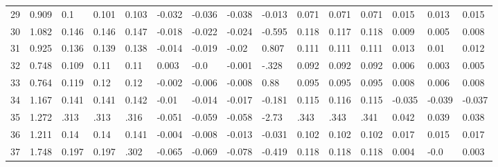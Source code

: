 \begin{table}
\begin{tabular}{|l|l|lll|lll|l|lll|lll}
		29 & 0.909 & 0.1 & 0.101 & 0.103 & -0.032 & -0.036 & -0.038 & -0.013 & 0.071 & 0.071 & 0.071 & 0.015 & 0.013 & 0.015 \\
		30 & 1.082 & 0.146 & 0.146 & 0.147 & -0.018 & -0.022 & -0.024 & -0.595 & 0.118 & 0.117 & 0.118 & 0.009 & 0.005 & 0.008 \\
		31 & 0.925 & 0.136 & 0.139 & 0.138 & -0.014 & -0.019 & -0.02 & 0.807 & 0.111 & 0.111 & 0.111 & 0.013 & 0.01 & 0.012 \\
		32 & 0.748 & 0.109 & 0.11 & 0.11 & 0.003 & -0.0 & -0.001 & -.328 & 0.092 & 0.092 & 0.092 & 0.006 & 0.003 & 0.005 \\
		33 & 0.764 & 0.119 & 0.12 & 0.12 & -0.002 & -0.006 & -0.008 & 0.88 & 0.095 & 0.095 & 0.095 & 0.008 & 0.006 & 0.008 \\
		34 & 1.167 & 0.141 & 0.141 & 0.142 & -0.01 & -0.014 & -0.017 & -0.181 & 0.115 & 0.116 & 0.115 & -0.035 & -0.039 & -0.037 \\
		35 & 1.272 & .313 & .313 & .316 & -0.051 & -0.059 & -0.058 & -2.73 & .343 & .343 & .341 & 0.042 & 0.039 & 0.038 \\
		36 & 1.211 & 0.14 & 0.14 & 0.141 & -0.004 & -0.008 & -0.013 & -0.031 & 0.102 & 0.102 & 0.102 & 0.017 & 0.015 & 0.017 \\
		37 & 1.748 & 0.197 & 0.197 & .302 & -0.065 & -0.069 & -0.078 & -0.419 & 0.118 & 0.118 & 0.118 & 0.004 & -0.0 & 0.003 
	\end{tabular}
	
\end{table}
